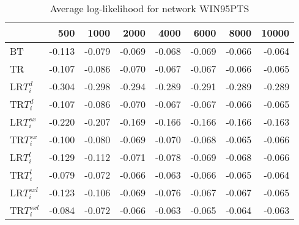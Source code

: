 \begin{table}
 \begin{center}
 \begin{tabular}{lrrrrrrr}
 & 500 & 1000 & 2000 & 4000 & 6000 & 8000 & 10000\\\hline
BT & -0.113 & -0.079 & -0.069 & -0.068 & -0.069 & -0.066 & -0.064\\\hline
TR & -0.107 & -0.086 & -0.070 & -0.067 & -0.067 & -0.066 & -0.065\\\hline
LR$T_i^d$ & -0.304 & -0.298 & -0.294 & -0.289 & -0.291 & -0.289 & -0.289\\\hline
TR$T_i^d$ & -0.107 & -0.086 & -0.070 & -0.067 & -0.067 & -0.066 & -0.065\\\hline
LR$T_i^{sx}$ & -0.220 & -0.207 & -0.169 & -0.166 & -0.166 & -0.166 & -0.163\\\hline
TR$T_i^{sx}$ & -0.100 & -0.080 & -0.069 & -0.070 & -0.068 & -0.065 & -0.066\\\hline
LR$T_i^l$ & -0.129 & -0.112 & -0.071 & -0.078 & -0.069 & -0.068 & -0.066\\\hline
TR$T_i^l$ & -0.079 & -0.072 & -0.066 & -0.063 & -0.066 & -0.065 & -0.064\\\hline
LR$T_i^{sxl}$ & -0.123 & -0.106 & -0.069 & -0.076 & -0.067 & -0.067 & -0.065\\\hline
TR$T_i^{sxl}$ & -0.084 & -0.072 & -0.066 & -0.063 & -0.065 & -0.064 & -0.063\\\hline
\end{tabular}
\end{center}
\caption{Average log-likelihood for network WIN95PTS }
\label{Win95ptsll}
\end{table}


